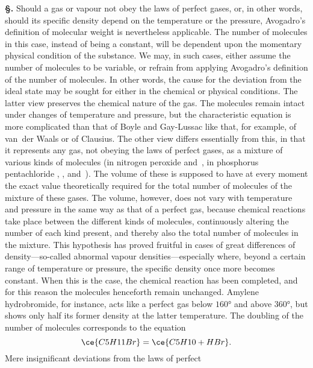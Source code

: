 \documentclass[12pt]{book}[2005/09/16]
\newcommand{\Erratum}[2]{#2}
\newcommand{\Section}[1]{
  \medskip\par\textbf{§\;#1}
  \label{section:#1}
}
\newcommand{\PageSep}[1]{\ignorespaces}
\begin{document}
\Section{43.} Should a gas or vapour not obey the laws of perfect
gases, or, in other words, should its specific density depend
on the temperature or the pressure, Avogadro's definition of
molecular weight is nevertheless applicable. The number
of molecules in this case, instead of being a constant, will
be dependent upon the momentary physical condition of the
substance. We may, in such cases, either assume the number
of molecules to be variable, or refrain from applying Avogadro's
definition of the number of molecules. In other words,
the cause for the deviation from the ideal state may be
\PageSep{30}
sought for either in the chemical or physical conditions. The
latter view preserves the chemical nature of the gas. The
molecules remain intact under changes of temperature and
pressure, but the characteristic equation is more complicated
than that of Boyle and Gay-Lussac like that, for example,
of van~der Waals or of Clausius. The other view differs
essentially from this, in that it represents any gas, not obeying
the laws of perfect gases, as a mixture of various kinds
of molecules (in nitrogen peroxide  and~, in phosphorus
%
pentachloride , , and~). The volume of
%
these is supposed to have at every moment the exact value
theoretically required for the total number of molecules of
the mixture of these gases. The volume, however, does not
vary with temperature and pressure in the same way as that
of a perfect gas, because chemical reactions take place
between the different kinds of molecules, continuously altering
the number of each kind present, and thereby also the
total number of molecules in the mixture. This hypothesis
has proved fruitful in cases of great differences of density---so-called
%
abnormal vapour densities---especially where, beyond
%
%
a certain range of temperature or pressure, the specific
density once more becomes constant. When this is the
case, the chemical reaction has been completed, and for this
reason the molecules henceforth remain unchanged. \Erratum{Hydrobromamylene}{Amylene hydrobromide},
\Erratum{\index{Hydrobromamylene}}{}%
for instance, acts like a perfect gas below
$160°$ and above $360°$, but shows only half its former density
at the latter temperature. The doubling of the number of
molecules corresponds to the equation
\[
\ce{C5H11Br} = \ce{C5H10 + HBr}.
\]
Mere insignificant deviations from the laws of perfect
\end{document}
